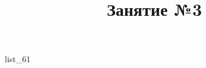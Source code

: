 \documentclass[12pt, a4paper]{article}
\begin{document}
	\title{Занятие №3}
	{list_61}
\end{document}
